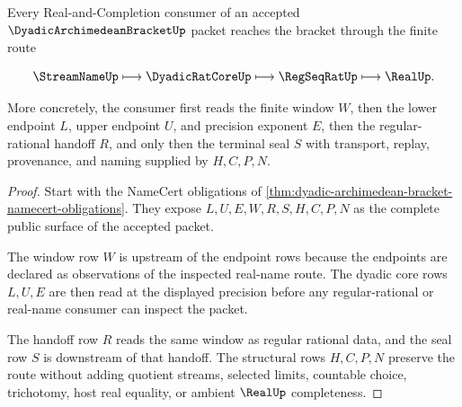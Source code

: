 \begin{theorem}
\label{thm:dyadic-archimedean-bracket-l10-handoff}
Every Real-and-Completion consumer of an accepted $\DyadicArchimedeanBracketUp$ packet reaches the bracket through the finite route

$$
\StreamNameUp \longmapsto \DyadicRatCoreUp \longmapsto \RegSeqRatUp \longmapsto \RealUp .
$$

More concretely, the consumer first reads the finite window $W$, then the lower endpoint $L$, upper endpoint $U$, and precision exponent $E$, then the regular-rational handoff $R$, and only then the terminal seal $S$ with transport, replay, provenance, and naming supplied by $H,C,P,N$.
\end{theorem}
\begin{proof}
Start with the NameCert obligations of \autoref{thm:dyadic-archimedean-bracket-namecert-obligations}. They expose $L,U,E,W,R,S,H,C,P,N$ as the complete public surface of the accepted packet.

The window row $W$ is upstream of the endpoint rows because the endpoints are declared as observations of the inspected real-name route. The dyadic core rows $L,U,E$ are then read at the displayed precision before any regular-rational or real-name consumer can inspect the packet.

The handoff row $R$ reads the same window as regular rational data, and the seal row $S$ is downstream of that handoff. The structural rows $H,C,P,N$ preserve the route without adding quotient streams, selected limits, countable choice, trichotomy, host real equality, or ambient $\RealUp$ completeness.
\end{proof}





